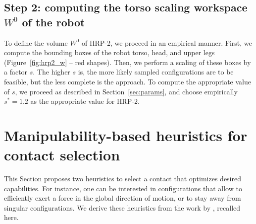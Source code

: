 \documentclass[journal]{IEEEtran}
\providecommand{\DIFaddtex}[1]{#1} %
\providecommand{\DIFdeltex}[1]{} %
\providecommand{\DIFaddbegin}{\protect\color{blue}} %
\providecommand{\DIFaddend}{\protect\color{black}} %
\providecommand{\DIFdelbegin}{\protect\cbdelete} %
\providecommand{\DIFdelend}{} %
\providecommand{\DIFadd}[1]{\texorpdfstring{\DIFaddtex{#1}}{#1}} %
\providecommand{\DIFdel}[1]{\texorpdfstring{\DIFdeltex{#1}}{}} %
\begin{document}
\subsection{Step 2: computing the torso scaling workspace $W^0$ of the robot}
To define the volume $W^0$ of HRP-2, we proceed in an empirical manner.
First, we compute the bounding boxes of the robot torso, head, and upper legs (Figure~\ref{fig:hrp2_w} -- red shapes).
Then, we perform a scaling of these boxes by a factor $s$. 
The higher $s$ is, the more likely sampled configurations are to be feasible, but the less complete is the approach.
To compute the appropriate value of $s$, we proceed as described in Section~\ref{sec:params}, and choose empirically
$s^*=1.2$ as the appropriate value for HRP-2.
\DIFdelbegin \section{\DIFdel{Heuristics and criteria for contact selection}}
\addtocounter{section}{-1}%
\DIFdelend %
\DIFdelbegin \subsection{\DIFdel{Manipulability-based heuristics for contact selection}}
\addtocounter{subsection}{-1}%
\DIFdelend %
\DIFaddbegin \section{\DIFadd{Manipulability-based heuristics for contact selection}}
\label{sec:heuristics}
\DIFaddend This Section proposes \DIFaddbegin \DIFadd{two }\DIFaddend heuristics to select a contact that optimizes desired capabilities.
For instance, one can be interested in configurations that allow to efficiently exert a force in the global direction of motion, \DIFdelbegin \DIFdel{a high velocity in a given direction, }\DIFdelend or to stay away from singular configurations.
We derive \DIFdelbegin \DIFdel{three such }\DIFdelend \DIFaddbegin \DIFadd{these }\DIFaddend heuristics from the work by \cite{Yoshikawa1984}, recalled here. %
\end{document}
